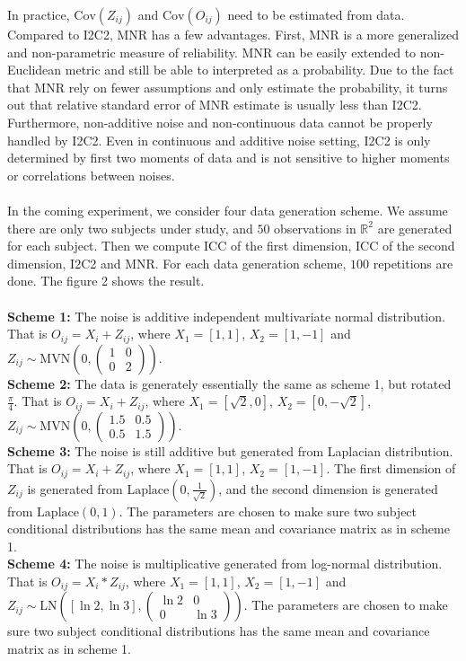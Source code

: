 \documentclass{article}
\begin{document}
In practice, $\text{Cov}(Z_{ij})$ and $\text{Cov}(O_{ij})$ need to be estimated from data. Compared to I2C2, MNR has a few advantages. First, MNR is a more generalized and non-parametric measure of reliability. MNR can be easily extended to non-Euclidean metric and still be able to interpreted as a probability. Due to the fact that MNR rely on fewer assumptions and only estimate the probability, it turns out that relative standard error of MNR estimate is usually less than I2C2. Furthermore, non-additive noise and non-continuous data cannot be properly handled by I2C2. Even in continuous and additive noise setting, I2C2 is only determined by first two moments of data and is not sensitive to higher moments or correlations between noises.\\
\\
In the coming experiment, we consider four data generation scheme. We assume there are only two subjects under study, and $50$ observations in $\mathbb{R}^2$ are generated for each subject. Then we compute ICC of the first dimension, ICC of the second dimension, I2C2 and MNR. For each data generation scheme, $100$ repetitions are done. The figure 2 shows the result.\\
\\
\textbf{Scheme 1:} The noise is additive independent multivariate normal distribution. That is $O_{ij}=X_i+Z_{ij}$, where $X_1=[1,1]$, $X_2=[1,-1]$ and $Z_{ij}\sim\text{MVN}(0,(\begin{matrix} 1 & 0 \\ 0 & 2\end{matrix}))$. \\
\textbf{Scheme 2:} The data is generately essentially the same as scheme 1, but rotated $\frac{\pi}{4}$. That is $O_{ij}=X_i+Z_{ij}$, where $X_1=[\sqrt{2},0]$, $X_2=[0,-\sqrt{2}]$, $Z_{ij}\sim\text{MVN}(0,(\begin{matrix} 1.5 & 0.5 \\ 0.5 & 1.5\end{matrix}))$. \\
\textbf{Scheme 3:} The noise is still additive but generated from Laplacian distribution. That is $O_{ij}=X_i+Z_{ij}$, where $X_1=[1,1]$, $X_2=[1,-1]$. The first dimension of $Z_{ij}$ is generated from $\text{Laplace}(0,\frac{1}{\sqrt{2}})$, and the second dimension is generated from $\text{Laplace}(0,1)$. The parameters are chosen to make sure two subject conditional distributions has the same mean and covariance matrix as in scheme 1. \\
\textbf{Scheme 4:} The noise is multiplicative generated from log-normal distribution. That is $O_{ij}=X_i*Z_{ij}$, where $X_1=[1,1]$, $X_2=[1,-1]$  and $Z_{ij}\sim\text{LN}([\ln{2},\ln{3}],(\begin{matrix} \ln{2} & 0 \\ 0 & \ln{3}\end{matrix}))$. The parameters are chosen to make sure two subject conditional distributions has the same mean and covariance matrix as in scheme 1. \\
\end{document}
